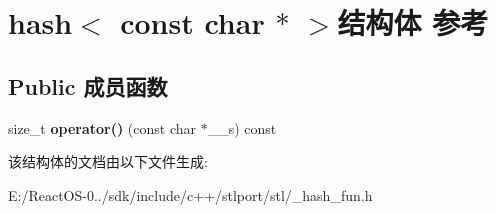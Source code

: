 \hypertarget{structhash_3_01const_01char_01_5_01_4}{}\section{hash$<$ const char $\ast$ $>$结构体 参考}
\label{structhash_3_01const_01char_01_5_01_4}
\subsection*{Public 成员函数}
\begin{DoxyCompactItemize}
\item 
\mbox{\label{structhash_3_01const_01char_01_5_01_4_a4c48892cfdd50772afeb5327c198cad9}} 
size\+\_\+t {\bfseries operator()} (const char $\ast$\+\_\+\+\_\+s) const
\end{DoxyCompactItemize}


该结构体的文档由以下文件生成\+:\begin{DoxyCompactItemize}
\item 
E\+:/\+React\+O\+S-\/0../sdk/include/c++/stlport/stl/\+\_\+hash\+\_\+fun.\+h\end{DoxyCompactItemize}
